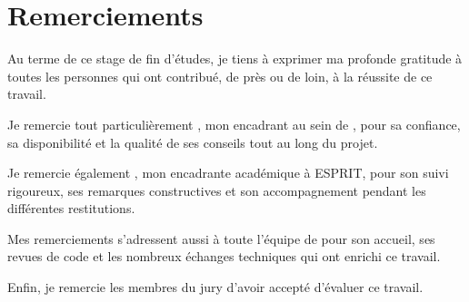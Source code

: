 \chapter*{Remerciements}
\thispagestyle{liminaire}

Au terme de ce stage de fin d'études, je tiens à exprimer ma profonde gratitude à toutes les personnes qui ont contribué, de près ou de loin, à la réussite de ce travail.

Je remercie tout particulièrement \encadrantentreprise, mon encadrant au sein de \entreprise, pour sa confiance, sa disponibilité et la qualité de ses conseils tout au long du projet.

Je remercie également \encadrantacademique, mon encadrante académique à ESPRIT, pour son suivi rigoureux, ses remarques constructives et son accompagnement pendant les différentes restitutions.

Mes remerciements s'adressent aussi à toute l'équipe de \entreprise{} pour son accueil, ses revues de code et les nombreux échanges techniques qui ont enrichi ce travail.

Enfin, je remercie les membres du jury d'avoir accepté d'évaluer ce travail.
